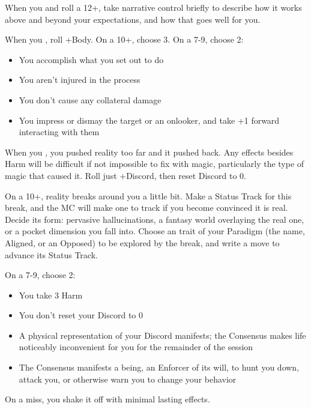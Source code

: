 \begin{multicols}{3}
  \SEPARATOR

  \begin{move}
    When you  and
    roll a 12+, take narrative control briefly to describe how it
    works above and beyond your expectations, and how that goes well
    for you.
  \end{move}

  \columnbreak
  
  \begin{move}
    When you , roll +Body. On a 10+, choose 3. On a 7-9,
    choose 2:
    \begin{itemize}
      \setlength\itemsep{0em}
    \item You accomplish what you set out to do
    \item You aren't injured in the process
    \item You don't cause any collateral damage
    \item You impress or dismay the target or an onlooker, and take +1
      forward interacting with them
    \end{itemize}
  \end{move}

  \SEPARATOR

  \begin{move}
    When you , you pushed reality too far and it
    pushed back. Any effects besides Harm will be difficult if not
    impossible to fix with magic, particularly the type of magic that
    caused it. Roll just +Discord, then reset Discord to 0.

    On a 10+, reality breaks around you a little bit. Make a Status
    Track for this break, and the MC will make one to track if you
    become convinced it is real. Decide its form: pervasive
    hallucinations, a fantasy world overlaying the real one, or a
    pocket dimension you fall into. Choose an trait of your Paradigm
    (the name, Aligned, or an Opposed) to be explored by the break,
    and write a move to advance its Status Track.

    On a 7-9, choose 2:
    \begin{itemize}
      \setlength\itemsep{0em}
    \item You take 3 Harm
    \item You don't reset your Discord to 0
    \item A physical representation of your Discord manifests; the
      Consensus makes life noticeably inconvenient for you for the
      remainder of the session
    \item The Consensus manifests a being, an Enforcer of its will, to
      hunt you down, attack you, or otherwise warn you to change your
      behavior
    \end{itemize}

    On a miss, you shake it off with minimal lasting effects.
  \end{move}

\end{multicols}

